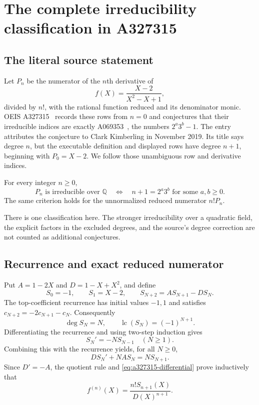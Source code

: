 \section{The complete irreducibility classification in A327315}
\label{sec:a327315}

\subsection{The literal source statement}

Let $P_n$ be the numerator of the $n$th derivative of
\[
 f(X)=\frac{X-2}{X^2-X+1},
\]
divided by $n!$, with the rational function reduced and its denominator
monic.  OEIS A327315~\cite{A327315} records these rows from $n=0$ and conjectures that
their irreducible indices are exactly A069353~\cite{A069353}, the numbers $2^a3^b-1$.
The entry attributes the conjecture to Clark Kimberling in November 2019.
Its title says degree $n$, but the executable definition and displayed
rows have degree $n+1$, beginning with $P_0=X-2$.  We follow those
unambiguous row and derivative indices.

\begin{theorem}
\label{thm:a327315}
For every integer $n\ge0$,
\[
 P_n\text{ is irreducible over }\mathbb Q
 \quad\Longleftrightarrow\quad
 n+1=2^a3^b\text{ for some }a,b\ge0.
\]
The same criterion holds for the unnormalized reduced numerator $n!P_n$.
\end{theorem}

There is one classification here.  The stronger irreducibility over a
quadratic field, the explicit factors in the excluded degrees, and the
source's degree correction are not counted as additional conjectures.

\subsection{Recurrence and exact reduced numerator}

Put $A=1-2X$ and $D=1-X+X^2$, and define
\[
 S_0=-1,\qquad S_1=X-2,\qquad
 S_{N+2}=A S_{N+1}-D S_N.
\]
The top-coefficient recurrence has initial values $-1,1$ and satisfies
$c_{N+2}=-2c_{N+1}-c_N$.  Consequently
\[
 \deg S_N=N,\qquad \operatorname{lc}(S_N)=(-1)^{N+1}.
\]
Differentiating the recurrence and using two-step induction gives
\[
 S_N'=-N S_{N-1}\quad(N\ge1).
\]
Combining this with the recurrence yields, for all $N\ge0$,
\begin{equation}
\label{eq:a327315-differential}
 D S_N'+N A S_N=N S_{N+1}.
\end{equation}
Since $D'=-A$, the quotient rule and
\eqref{eq:a327315-differential} prove inductively that
\begin{equation}
\label{eq:a327315-derivative}
 f^{(n)}(X)=\frac{n!S_{n+1}(X)}{D(X)^{n+1}}.
\end{equation}

